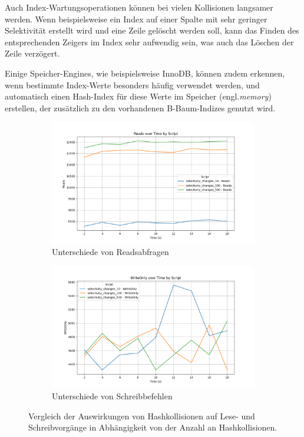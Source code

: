Auch Index-Wartungsoperationen können bei vielen Kollisionen langsamer werden.
Wenn beispielsweise ein Index auf einer Spalte mit sehr geringer Selektivität erstellt wird und eine Zeile gelöscht werden soll, kann das Finden des entsprechenden Zeigers im Index sehr aufwendig sein, was auch das Löschen der Zeile verzögert.


Einige Speicher-Engines, wie beispielsweise InnoDB, können zudem erkennen, wenn bestimmte Index-Werte besonders häufig verwendet werden, und automatisch einen Hash-Index für diese Werte im Speicher (engl.\textit{memory}) erstellen, der zusätzlich zu den vorhandenen B-Baum-Indizes genutzt wird.


\begin{figure}[!ht]
    \centering
    \begin{subfigure}[t]{0.48\textwidth}
        \centering
        \includegraphics[width=\textwidth]{PNGs/Index/Hash/Hashcol_Reads}
        \caption[Hash - Kollisionen - Reads - Ergebnis]{Unterschiede von Readsabfragen}
        \label{hash-collision-reads}
    \end{subfigure}
    \hfill
    \begin{subfigure}[t]{0.48\textwidth}
        \centering
        \includegraphics[width=\textwidth]{PNGs/Index/Hash/Hashcol_Writes}
        \caption[Hash - Kollisionen - Writes - Ergebnis]{Unterschiede von Schreibbefehlen}
        \label{hash-collision-writes}
    \end{subfigure}
    \caption[Hash-Kollisionen: Reads und Writes]{Vergleich der Auswirkungen von Hashkollisionen auf Lese- und Schreibvorgänge in Abhängigkeit von der Anzahl an Hashkollisionen.}
    \label{fig:hash-collision-comparison}
\end{figure}

